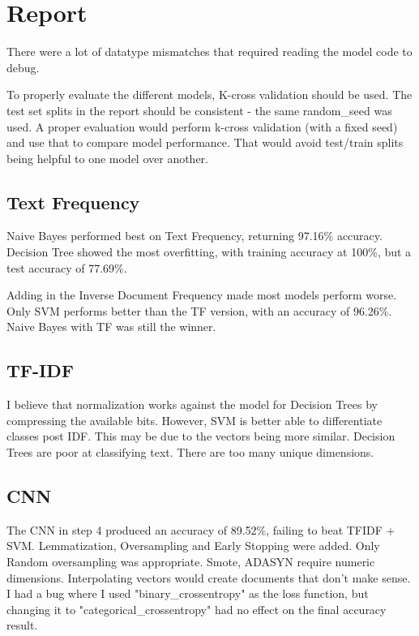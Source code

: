 \documentclass[11pt]{article}
\begin{document}
\section{Report}

There were a lot of datatype mismatches that required reading the model code to debug.

To properly evaluate the different models, K-cross validation should be used. The test set splits in the report should be consistent - the same random\_seed was used. A proper evaluation would perform k-cross validation (with a fixed seed) and use that to compare model performance. That would avoid test/train splits being helpful to one model over another.

\subsection{Text Frequency}

Naive Bayes performed best on Text Frequency, returning 97.16\% accuracy. Decision Tree showed the most overfitting, with training accuracy at 100\%, but a test accuracy of 77.69\%.

Adding in the Inverse Document Frequency made most models perform worse. Only SVM performs better than the TF version, with an accuracy of 96.26\%. Naive Bayes with TF was still the winner.

\subsection{TF-IDF}

I believe that normalization works against the model for Decision Trees by compressing the available bits. However, SVM is better able to differentiate classes post IDF. This may be due to the vectors being more similar. Decision Trees are poor at classifying text. There are too many unique dimensions.

\subsection{CNN}

The CNN in step 4 produced an accuracy of 89.52\%, failing to beat TFIDF + SVM. Lemmatization, Oversampling and Early Stopping were added. Only Random oversampling was appropriate. Smote, ADASYN require numeric dimensions. Interpolating vectors would create documents that don't make sense. I had a bug where I used "binary\_crossentropy" as the loss function, but changing it to "categorical\_crossentropy" had no effect on the final accuracy result.
\end{document}
